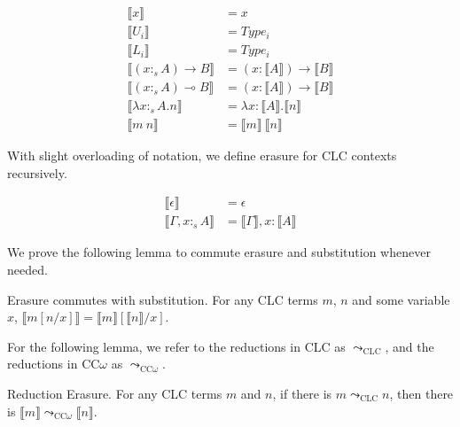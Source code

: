 \documentclass[sigplan,screen,review,anonymous]{acmart}
\newcommand{\stype}[1]{:_#1}
\newcommand{\step}{\leadsto}
\newcommand{\erase}[1]{\llbracket #1 \rrbracket}
\begin{document}
\begin{definition}
  \begin{align*}
    \erase{x}                             & = x                                     \\
    \erase{U_i}                           & = Type_i                                \\
    \erase{L_i}                           & = Type_i                                \\
    \erase{(x \stype{s} A) \rightarrow B} & = (x : \erase{A}) \rightarrow \erase{B} \\
    \erase{(x \stype{s} A) \multimap B}   & = (x : \erase{A}) \rightarrow \erase{B} \\
    \erase{\lambda x\stype{s}A.n}         & = \lambda x : \erase{A}.\erase{n}       \\
    \erase{m\ n}                          & = \erase{m}\ \erase{n}
  \end{align*}
\end{definition}

With slight overloading of notation, we define erasure for CLC contexts recursively.

\begin{definition}
  \begin{align*}
    \erase{\epsilon}              & = \epsilon                      \\
    \erase{\Gamma, x \stype{s} A} & = \erase{\Gamma}, x : \erase{A}
  \end{align*}
\end{definition}

We prove the following lemma to commute erasure and substitution whenever needed.

\begin{lemma}
  Erasure commutes with substitution. For any CLC terms $m$, $n$ and some variable $x$, $\erase{m[n/x]} = \erase{m}[\erase{n}/x]$.
\end{lemma}

For the following lemma, we refer to the reductions in CLC as $\step_{\scriptscriptstyle \text{CLC}}$, and the reductions in CC$\omega$ as $\step_{\scriptscriptstyle \text{CC$\omega$}}$.

\begin{theorem} \label{preserve}
  Reduction Erasure. For any CLC terms $m$ and $n$, if there is $m \step_{\scriptscriptstyle \text{CLC}} n$, then there is $\erase{m} \step_{\scriptscriptstyle \text{CC$\omega$}} \erase{n}$.
\end{theorem}
\end{document}
